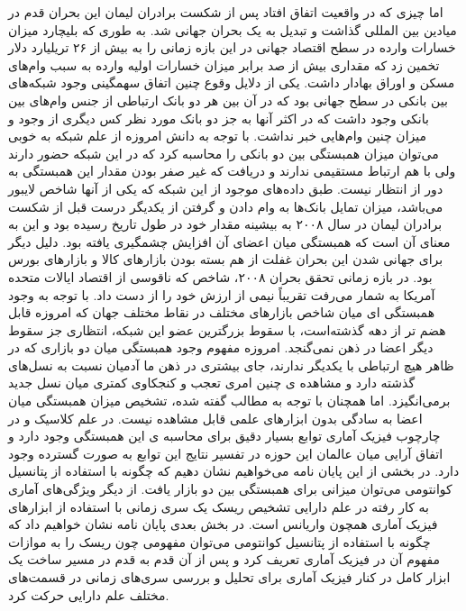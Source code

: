 \documentclass[a4paper,titlepage,12pt,fleqn,oneside]{report}
\begin{document}
اما چیزی که در واقعیت اتفاق افتاد پس از شکست برادران لیمان این بحران قدم در میادین بین المللی گذاشت و تبدیل به یک بحران جهانی شد.  به طوری که بلیچارد  میزان خسارات وارده در سطح اقتصاد جهانی در این بازه زمانی را به بیش از ۲۶ تریلیارد دلار تخمین زد که مقداری بیش از صد برابر میزان خسارات اولیه وارده به سبب وام‌های مسکن و اوراق بهادار داشت.  
یکی از دلایل وقوع چنین اتفاق  سهمگینی وجود شبکه‌های بین بانکی در سطح جهانی بود که در آن بین هر دو بانک ارتباطی از جنس وام‌های بین بانکی وجود داشت که در اکثر آنها به جز دو بانک مورد نظر کس دیگری از وجود و میزان چنین وام‌هایی خبر نداشت.  با توجه به دانش امروزه  از علم شبکه به خوبی می‌توان میزان همبستگی بین دو بانکی را محاسبه کرد که در این شبکه حضور دارند ولی با هم ارتباط مستقیمی ندارند و دریافت که غیر صفر بودن مقدار این همبستگی به دور از انتظار نیست.  طبق داده‌های موجود از این شبکه که یکی از آنها شاخص لایبور می‌باشد،  میزان تمایل بانک‌ها به وام دادن و گرفتن از یکدیگر درست قبل از شکست برادران لیمان در سال ۲۰۰۸ به بیشینه مقدار خود در طول تاریخ رسیده بود و این به معنای آن است که همبستگی میان اعضای آن افزایش چشمگیری یافته بود. 
دلیل دیگر برای جهانی شدن این بحران غفلت از هم بسته بودن بازارهای کالا و بازارهای بورس بود. در بازه زمانی تحقق  بحران ۲۰۰۸،   شاخص  که ناقوسی از اقتصاد ایالات متحده آمریکا به شمار می‌رفت تقریباً نیمی از ارزش خود را از دست داد.  با توجه به وجود همبستگی ای میان شاخص بازارهای مختلف در نقاط مختلف جهان که امروزه قابل هضم تر از دهه گذشته‌است،  با سقوط بزرگترین عضو این شبکه،  انتظاری جز سقوط دیگر اعضا در ذهن نمی‌گنجد.
امروزه مفهوم وجود همبستگی میان دو بازاری که در ظاهر هیچ ارتباطی با یکدیگر ندارند،  جای بیشتری در ذهن ما آدمیان نسبت به نسل‌های گذشته دارد و مشاهده ی چنین امری تعجب و کنجکاوی کمتری میان نسل جدید برمی‌انگیزد. اما همچنان با توجه به مطالب گفته شده، تشخیص میزان همبستگی میان اعضا به سادگی بدون ابزارهای علمی قابل مشاهده نیست. در علم کلاسیک و در چارچوب فیزیک آماری توابع بسیار دقیق برای محاسبه ی این همبستگی وجود دارد و اتفاق آرایی میان عالمان این حوزه در تفسیر نتایج این توابع به صورت گسترده وجود دارد. در بخشی از این پایان نامه می‌خواهیم نشان دهیم که چگونه با استفاده از پتانسیل کوانتومی می‌توان میزانی برای همبستگی بین دو بازار یافت.  از دیگر ویژگی‌های آماری به کار رفته در علم دارایی تشخیص ریسک یک سری زمانی با استفاده از ابزار‌های فیزیک آماری همچون واریانس است. در بخش بعدی پایان نامه نشان خواهیم داد که چگونه با استفاده از پتانسیل کوانتومی می‌توان  مفهومی چون ریسک را به موازات مفهوم آن در فیزیک آماری تعریف کرد و پس از آن قدم به قدم در مسیر ساخت یک ابزار کامل در کنار فیزیک آماری برای تحلیل و بررسی سری‌های زمانی در قسمت‌های مختلف علم دارایی حرکت کرد.
 \newpage
\end{document}
